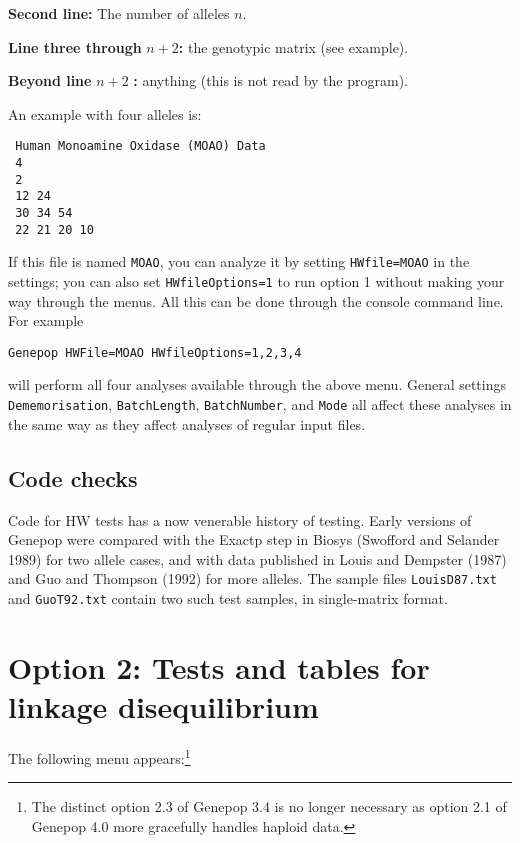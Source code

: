 \documentclass[12pt,]{book}
\let\rmarkdownfootnote\footnote%
\def\footnote{\protect\rmarkdownfootnote}
\theoremstyle{definition}
\theoremstyle{definition}
\theoremstyle{definition}
\theoremstyle{remark}
\begin{document}
\textbf{Second line:} The number of alleles \(n\).

\textbf{Line three through} \(n+2\)\textbf{:} the genotypic matrix (see
example).

\textbf{Beyond line} \(n+2\) \textbf{:} anything (this is not read by
the program).

An example with four alleles is:

\begin{verbatim}
 Human Monoamine Oxidase (MOAO) Data
 4
 2
 12 24
 30 34 54
 22 21 20 10
\end{verbatim}

If this file is named \texttt{MOAO}, you can analyze it by setting
\texttt{HWfile=MOAO} in the settings; you can also set
\texttt{HWfileOptions=1} to run option 1
without making your way through the menus. All this can be done through
the console command line. For example

\begin{verbatim}
Genepop HWFile=MOAO HWfileOptions=1,2,3,4
\end{verbatim}

will perform all four analyses available through the above menu. General
settings \texttt{Dememorisation}, \texttt{BatchLength},
\texttt{BatchNumber}, and \texttt{Mode} all affect these analyses in the
same way as they affect analyses of regular input files.

\subsection{Code checks}\label{code-checks}

 Code for HW tests has a now venerable history of
testing. Early versions of Genepop were compared with the Exactp step in
Biosys (Swofford and Selander 1989) for two allele cases, and with data
published in Louis and Dempster (1987) and Guo and Thompson (1992) for
more alleles. The sample files \texttt{LouisD87.txt} and
\texttt{GuoT92.txt} contain two such test samples, in single-matrix
format.

\section{Option 2: Tests and tables for linkage
disequilibrium}\label{option-2-tests-and-tables-for-linkage-disequilibrium}

The following menu appears:\footnote{The distinct option 2.3 of Genepop
  3.4 is no longer necessary as option 2.1 of Genepop 4.0 more
  gracefully handles haploid data.}
\end{document}
